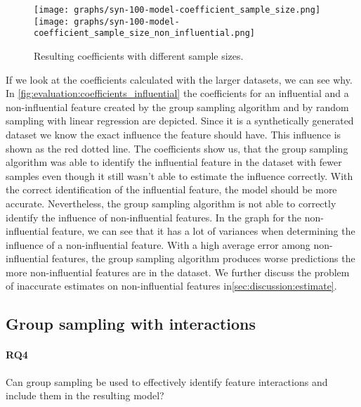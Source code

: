 \documentclass[../thesis.tex]{subfiles}
\begin{document}
\begin{figure}[h]
      \texttt{[image: graphs/syn-100-model-coefficient\_sample\_size.png]}
      \texttt{[image: graphs/syn-100-model-coefficient\_sample\_size\_non\_influential.png]}
      \caption[Model coefficients - synthetic data with different sample sizes]{
            Resulting coefficients with different sample sizes.
      }\label{fig:evaluation:coefficients_influential}
\end{figure}

If we look at the coefficients calculated with the larger datasets, we can see why.
In \autoref{fig:evaluation:coefficients_influential} the coefficients for an influential and a non-influential feature
created by the group sampling algorithm
and by random sampling with linear regression are depicted. Since it is a synthetically generated
dataset we know the exact influence the feature should have. This influence is shown as the red dotted line.
The coefficients show us, that the group sampling algorithm was able to identify the influential feature in
the dataset with fewer samples even though it still wasn't able to estimate the influence correctly.
With the correct identification of the influential feature, the model should be more accurate. 
Nevertheless, the group sampling algorithm is not able to correctly identify the influence of non-influential features.
In the graph for the non-influential feature, we can see that it has a lot of variances when determining the influence of a non-influential feature.
With a high average error among non-influential features, the group sampling algorithm produces
worse predictions the more non-influential features are in the dataset. 
We further discuss the problem of inaccurate estimates on non-influential features in\autoref{sec:discussion:estimate}.



\subsection{Group sampling with interactions}\label{sec:evaluation:interactions}
\paragraph{RQ4} Can group sampling be used to effectively identify feature interactions and include them in the resulting model?
\paragraph{}
\end{document}
